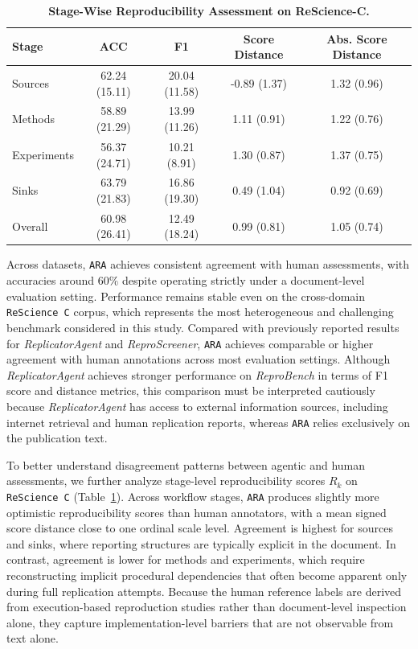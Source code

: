 \documentclass{article}
\begin{document}
\begin{table}[!ht]
    \centering
    \caption{\textbf{Stage-Wise Reproducibility Assessment on ReScience-C.}}
    \label{tab:rescience-ara-scores}
    \begin{tabular}{lcccc}
        \toprule
        \textbf{Stage} & \textbf{ACC} & \textbf{F1} & \textbf{Score Distance} & \textbf{Abs. Score Distance} \\
        \midrule
        Sources 
        & 62.24 (15.11) 
        & 20.04 (11.58) 
        & -0.89 (1.37) 
        & 1.32 (0.96) \\
        Methods 
        & 58.89 (21.29) 
        & 13.99 (11.26) 
        & 1.11 (0.91) 
        & 1.22 (0.76) \\
        Experiments 
        & 56.37 (24.71) 
        & 10.21 (8.91) 
        & 1.30 (0.87) 
        & 1.37 (0.75) \\
        Sinks 
        & 63.79 (21.83) 
        & 16.86 (19.30) 
        & 0.49 (1.04) 
        & 0.92 (0.69) \\
        \midrule
        Overall 
        & 60.98 (26.41) 
        & 12.49 (18.24) 
        & 0.99 (0.81) 
        & 1.05 (0.74) \\
        \bottomrule
    \end{tabular}
\end{table}

Across datasets, \texttt{ARA} achieves consistent agreement with human assessments, with accuracies around $60\%$ despite operating strictly under a document-level evaluation setting.
Performance remains stable even on the cross-domain \texttt{ReScience C} corpus, which represents the most heterogeneous and challenging benchmark considered in this study.
Compared with previously reported results for \textit{ReplicatorAgent} and \textit{ReproScreener}, \texttt{ARA} achieves comparable or higher agreement with human annotations across most evaluation settings.
Although \textit{ReplicatorAgent} achieves stronger performance on \textit{ReproBench} in terms of F1 score and distance metrics, this comparison must be interpreted cautiously because \textit{ReplicatorAgent} has access to external information sources, including internet retrieval and human replication reports, whereas \texttt{ARA} relies exclusively on the publication text.

To better understand disagreement patterns between agentic and human assessments, we further analyze stage-level reproducibility scores $R_k$ on \texttt{ReScience C} (Table~\ref{tab:rescience-ara-scores}).
Across workflow stages, \texttt{ARA} produces slightly more optimistic reproducibility scores than human annotators, with a mean signed score distance close to one ordinal scale level.
Agreement is highest for sources and sinks, where reporting structures are typically explicit in the document.
In contrast, agreement is lower for methods and experiments, which require reconstructing implicit procedural dependencies that often become apparent only during full replication attempts.
Because the human reference labels are derived from execution-based reproduction studies rather than document-level inspection alone, they capture implementation-level barriers that are not observable from text alone.
\end{document}

